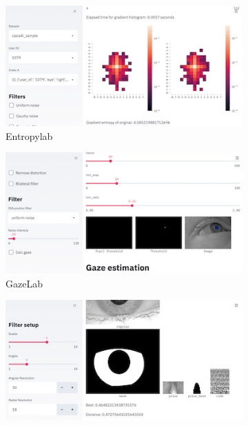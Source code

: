 \begin{figure}
	\begin{subfigure}{0.3\textwidth}\centering
		\includegraphics[width=1\linewidth]{figures/labs/EntropyLab}
		\caption{Entropylab}\label{fig:tools:entropylab}
	\end{subfigure}
	\hfill
	\begin{subfigure}{0.3\textwidth}\centering
		\includegraphics[width=1\linewidth]{figures/labs/GazeLab}
		\caption{GazeLab}\label{fig:tools:gazelab}
	\end{subfigure}
	\hfill
	\begin{subfigure}{0.3\textwidth}\centering
		\includegraphics[width=1\linewidth]{figures/labs/ObfuscationLab}

\end{subfigure}
\end{figure}

